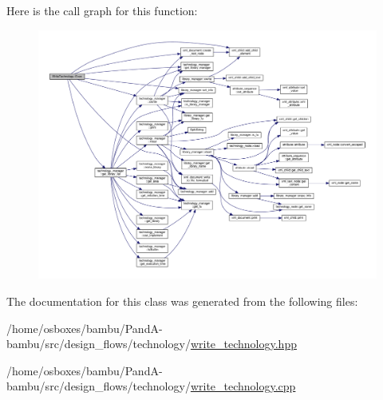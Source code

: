 Here is the call graph for this function\+:
\nopagebreak
\begin{figure}[H]
\begin{center}
\leavevmode
\includegraphics[width=350pt]{d9/dfc/classWriteTechnology_a0effd2133532682e6d116262e4782bf5_cgraph}
\end{center}
\end{figure}


The documentation for this class was generated from the following files\+:\begin{DoxyCompactItemize}
\item 
/home/osboxes/bambu/\+Pand\+A-\/bambu/src/design\+\_\+flows/technology/\hyperlink{write__technology_8hpp}{write\+\_\+technology.\+hpp}\item 
/home/osboxes/bambu/\+Pand\+A-\/bambu/src/design\+\_\+flows/technology/\hyperlink{write__technology_8cpp}{write\+\_\+technology.\+cpp}\end{DoxyCompactItemize}
